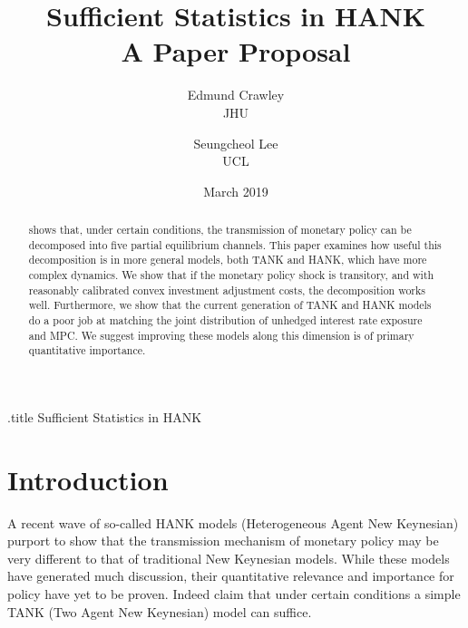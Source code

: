 \documentclass[titlepage]{\econtex}\newcommand{\texname}{ConsumptionHeterogeneity}
\begin{document}



\begin{verbatimwrite}{\jobname.title}
Sufficient Statistics in HANK
\end{verbatimwrite}


\title{ 
	\bigskip
	\bigskip
	Sufficient Statistics in HANK \\ A Paper Proposal}

\author{
  Edmund Crawley\authNum   \\ {\small JHU}
  \and
  Seungcheol Lee\authNum    \\ {\small UCL}
}


\keywords{}
\jelclass{}

\date{March 2019}
\maketitle


\begin{abstract}
\cite{auclert_monetary_2017} shows that, under certain conditions, the transmission of monetary policy can be decomposed into five partial equilibrium channels. This paper examines how useful this decomposition is in more general models, both TANK and HANK, which have more complex dynamics. We show that if the monetary policy shock is transitory, and with reasonably calibrated convex investment adjustment costs, the decomposition works well. Furthermore, we show that the current generation of TANK and HANK models do a poor job at matching the joint distribution of unhedged interest rate exposure and MPC. We suggest improving these models along this dimension is of primary quantitative importance.
\end{abstract}


\begin{authorsinfo}
\end{authorsinfo}

\titlepagefinish
\setcounter{page}{1}

\pagebreak
\section{Introduction}
A recent wave of so-called HANK models (Heterogeneous Agent New Keynesian) purport to show that the transmission mechanism of monetary policy may be very different to that of traditional New Keynesian models. While these models have generated much discussion, their quantitative relevance and importance for policy have yet to be proven. Indeed \cite{dgHANKTANK} claim that under certain conditions a simple TANK (Two Agent New Keynesian) model can suffice.
\end{document}
